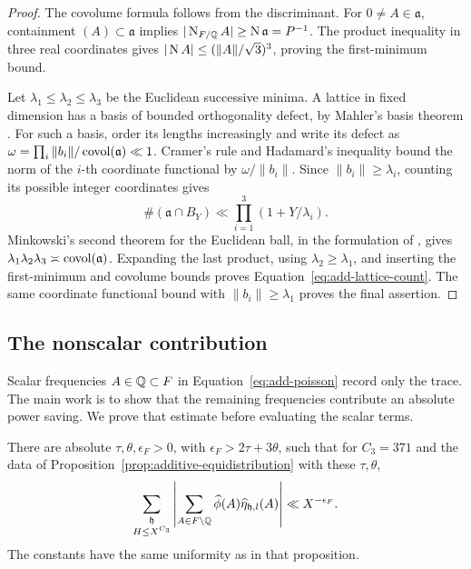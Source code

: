 \begin{proof}
The covolume formula follows from the discriminant.  For \(0\ne A\in
\mathfrak a\), containment \((A)\subset\mathfrak a\) implies
\(|\operatorname{N}_{F/\mathbb Q}A|\ge \operatorname{N}\mathfrak a=P^{-1}\).  The product inequality in
three real coordinates gives
\(|\operatorname{N} A|\le(\|A\|/\sqrt3)^3\), proving the first-minimum bound.

Let \(\lambda_1\le\lambda_2\le\lambda_3\) be the Euclidean successive
minima.  A lattice in fixed dimension has a basis of bounded orthogonality
defect, by Mahler's basis theorem \cite[Section~2, Theorem~1]{Mahler1946}.
For such a basis, order its lengths increasingly and write its defect as
\(\omega=\prod_i\|b_i\|/\operatorname{covol}(\mathfrak a)\ll1\).
Cramer's rule and Hadamard's inequality bound the norm of the \(i\)-th
coordinate functional by \(\omega/\|b_i\|\).  Since
\(\|b_i\|\ge\lambda_i\), counting its possible integer coordinates gives
\[
 \#(\mathfrak a\cap B_Y)\ll
       \prod_{i=1}^3(1+Y/\lambda_i).
\]
Minkowski's second theorem for the Euclidean ball, in the formulation of
\cite[Theorem~4.3]{Widmer2010}, gives
\(\lambda_1\lambda_2\lambda_3\asymp\operatorname{covol}(\mathfrak a)\).
Expanding the last product, using \(\lambda_2\ge\lambda_1\), and inserting
the first-minimum and covolume bounds proves
Equation~\eqref{eq:add-lattice-count}.  The same coordinate functional
bound with \(\|b_i\|\ge\lambda_1\) proves the final assertion.
\end{proof}

\subsection{The nonscalar contribution}

Scalar frequencies \(A\in\mathbb Q\subset F\) in
Equation~\eqref{eq:add-poisson} record only the trace.  The main work is to
show that the remaining frequencies contribute an absolute power saving.
We prove that estimate before evaluating the scalar terms.

\begin{lemma}
\label{lem:add-nonscalar}
There are absolute \(\tau,\theta,\epsilon_F>0\), with
\(\epsilon_F>2\tau+3\theta\), such that for \(C_3=371\) and the data of
Proposition~\ref{prop:additive-equidistribution} with these
\(\tau,\theta\),
\begin{equation}
 \sum_{\substack{\mathfrak h\\H\le X^{C_3}}}
   \left|
    \sum_{A\in F\setminus\mathbb Q}
       \widehat\phi(A)\widehat\eta_{\mathfrak h,l}(A)
   \right|
     \ll X^{-\epsilon_F}.
 \label{eq:add-nonscalar}
\end{equation}
The constants have the same uniformity as in that proposition.
\end{lemma}

